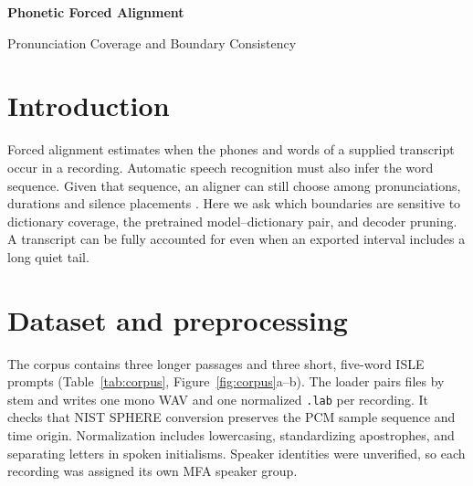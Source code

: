 \documentclass[11pt,a4paper]{article}
\newcommand{\measure}[1]{\texttt{#1}}
\newcommand{\reportauthor}{}
\begin{document}
{\LARGE\bfseries Phonetic Forced Alignment\par}
\vspace{2pt}
{\large Pronunciation Coverage and Boundary Consistency\par}
\ifx\reportauthor\empty\else\medskip\reportauthor\par\fi
\medskip

\begin{abstract}
We examined how pronunciation coverage, the choice of pretrained configuration, and beam width affect forced alignment on six supplied recordings (97.16 s, 243 word tokens). Montreal Forced Aligner produced 24 validated TextGrids across four configurations. The baseline lexicon lacked six spellings occurring in seven tokens. Grapheme-to-phoneme augmentation supplied candidates for those spellings, removed seven unknown-phone intervals, and preserved both boundaries for 231 of 243 words. The alternative English US ARPA model and dictionary preserved both boundaries for 64 words. Increasing the beam and retry beam produced byte-identical TextGrids. The largest word-end discrepancy was 2.44 s for “bed”, where the baseline labelled a much quieter trailing region as part of the final stop. These comparisons measure coverage and agreement on a small corpus with no independent timing annotations.
\end{abstract}

\section{Introduction}
Forced alignment estimates when the phones and words of a supplied transcript occur in a recording. Automatic speech recognition must also infer the word sequence. Given that sequence, an aligner can still choose among pronunciations, durations and silence placements \cite{mfa}. Here we ask which boundaries are sensitive to dictionary coverage, the pretrained model–dictionary pair, and decoder pruning. A transcript can be fully accounted for even when an exported interval includes a long quiet tail.

\section{Dataset and preprocessing}
The corpus contains three longer passages and three short, five-word ISLE prompts (Table~\ref{tab:corpus}, Figure~\ref{fig:corpus}a–b). The loader pairs files by stem and writes one mono WAV and one normalized \measure{.lab} per recording. It checks that NIST SPHERE conversion preserves the PCM sample sequence and time origin. Normalization includes lowercasing, standardizing apostrophes, and separating letters in spoken initialisms. Speaker identities were unverified, so each recording was assigned its own MFA speaker group.
\end{document}
